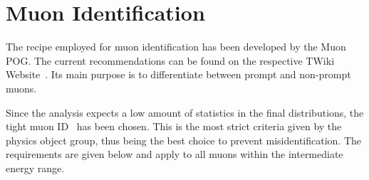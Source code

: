 \section{Muon Identification}
\label{sec:muonid}

The recipe employed for muon identification has been developed by the Muon POG. The current recommendations can be found on the respective TWiki Website~\cite{muonpog}. Its main purpose is to differentiate between prompt and non-prompt muons.

Since the analysis expects a low amount of statistics in the final distributions, the tight muon ID~\cite{muonid1, muonid2} has been chosen. This is the most strict criteria given by the physics object group, thus being the best choice to prevent misidentification. The requirements are given below and apply to all muons within the intermediate energy range.


